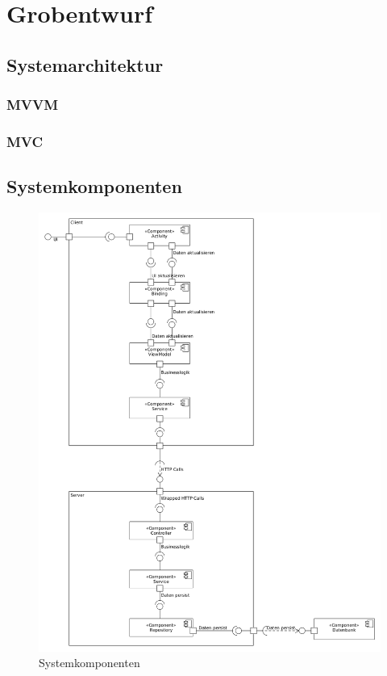 \documentclass[a4paper]{scrreprt}
\begin{document}
\chapter{Grobentwurf}
	\section{Systemarchitektur}
		
		\subsection{MVVM}
			
		\subsection{MVC}
			
		
	\section{Systemkomponenten}
	      \begin{figure}[H]
	       \centering
	       \includegraphics[scale = .35]{systemkomponenten.png}
	       \caption{Systemkomponenten}
	      \end{figure}
      
\end{document}

